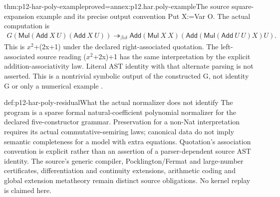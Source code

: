 \begin{hbtheorem}{thm:p12-har-poly-example}{proved=annex:p12.har.poly-example}{The source square-expansion example and its precise output convention}
Put X:=Var O. The actual computation is
\[
\begin{aligned}
 G(\mathsf{Mul}(\mathsf{Add}\ X\ U)(\mathsf{Add}\ X\ U))
 \twoheadrightarrow_{\beta\iota\delta}
 \mathsf{Add}(\mathsf{Mul}\ X\ X)
  (\mathsf{Add}(\mathsf{Mul}(\mathsf{Add}\ U\ U)X)U).
\end{aligned}
\]
This is \(x^2\)+(2x+1) under the declared right-associated quotation.
The left-associated source reading (\(x^2\)+2x)+1 has the same interpretation
by the explicit addition-associativity law. Literal AST identity with
that alternate parsing is not asserted. This is a nontrivial symbolic
output of the constructed G, not identity G or only a numerical example
\cite[pp.~1221--1222]{BarendregtGeuvers2001}.
\end{hbtheorem}

\begin{proofboundary}{def:p12-har-poly-residual}{What the actual normalizer does not identify}
The program is a sparse formal natural-coefficient polynomial normalizer
for the declared five-constructor grammar. Preservation for a non-Nat
interpretation requires its actual commutative-semiring laws; canonical
data do not imply semantic completeness for a model with extra equations.
Quotation's association convention is explicit rather than an assertion
of a parser-dependent source AST identity. The source's generic compiler,
Pocklington/Fermat and large-number certificates, differentiation and
continuity extensions, arithmetic coding and global extension metatheory
remain distinct source obligations. No kernel replay is claimed here.
\end{proofboundary}
